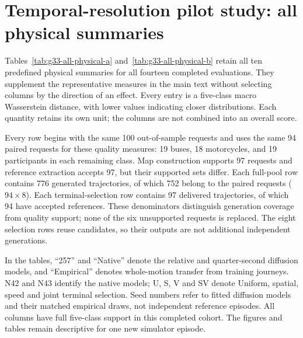 \section{Temporal-resolution pilot study: all physical summaries}
Tables~\ref{tab:g33-all-physical-a} and~\ref{tab:g33-all-physical-b} retain all ten predefined physical summaries for all fourteen completed evaluations. They supplement the representative measures in the main text without selecting columns by the direction of an effect. Every entry is a five-class macro Wasserstein distance, with lower values indicating closer distributions. Each quantity retains its own unit; the columns are not combined into an overall score.

Every row begins with the same 100 out-of-sample requests and uses the same 94 paired requests for these quality measures: 19 buses, 18 motorcycles, and 19 participants in each remaining class. Map construction supports 97 requests and reference extraction accepts 97, but their supported sets differ. Each full-pool row contains 776 generated trajectories, of which 752 belong to the paired requests ($94\times8$). Each terminal-selection row contains 97 delivered trajectories, of which 94 have accepted references. These denominators distinguish generation coverage from quality support; none of the six unsupported requests is replaced. The eight selection rows reuse candidates, so their outputs are not additional independent generations.

In the tables, ``257'' and ``Native'' denote the relative and quarter-second diffusion models, and ``Empirical'' denotes whole-motion transfer from training journeys. N42 and N43 identify the native models; U, S, V and SV denote Uniform, spatial, speed and joint terminal selection. Seed numbers refer to fitted diffusion models and their matched empirical draws, not independent reference episodes. All columns have full five-class support in this completed cohort. The figures and tables remain descriptive for one new simulator episode.

